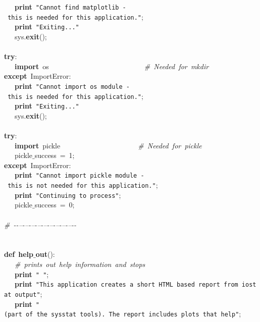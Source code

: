 \mbox{}\ \ \ \textbf{print}\ \texttt{"{}Cannot\ find\ matplotlib\ -\ this\ is\ needed\ for\ this\ application."{}}; \\
\mbox{}\ \ \ \textbf{print}\ \texttt{"{}Exiting..."{}} \\
\mbox{}\ \ \ sys.\textbf{exit}(); \\
\mbox{} \\
\mbox{}\textbf{try}: \\
\mbox{}\ \ \ \textbf{import}\ os\ \ \ \ \ \ \ \ \ \ \ \ \ \ \ \ \ \ \ \ \ \ \ \ \ \ \ \textit{\#\ Needed\ for\ mkdir} \\
\mbox{}\textbf{except}\ ImportError: \\
\mbox{}\ \ \ \textbf{print}\ \texttt{"{}Cannot\ import\ os\ module\ -\ this\ is\ needed\ for\ this\ application."{}}; \\
\mbox{}\ \ \ \textbf{print}\ \texttt{"{}Exiting..."{}} \\
\mbox{}\ \ \ sys.\textbf{exit}(); \\
\mbox{} \\
\mbox{}\textbf{try}: \\
\mbox{}\ \ \ \textbf{import}\ pickle\ \ \ \ \ \ \ \ \ \ \ \ \ \ \ \ \ \ \ \ \ \ \textit{\#\ Needed\ for\ pickle} \\
\mbox{}\ \ \ pickle$\_$success\ =\ 1; \\
\mbox{}\textbf{except}\ ImportError: \\
\mbox{}\ \ \ \textbf{print}\ \texttt{"{}Cannot\ import\ pickle\ module\ -\ this\ is\ not\ needed\ for\ this\ application."{}}; \\
\mbox{}\ \ \ \textbf{print}\ \texttt{"{}Continuing\ to\ process"{}}; \\
\mbox{}\ \ \ pickle$\_$success\ =\ 0; \\
\mbox{} \\
\mbox{}\textit{\#\ -\/-\/--\/-\/--\/-\/--\/-\/--\/-\/--\/-\/--\/-\/--\/-\/--\/-\/--\/-\/-} \\
\mbox{} \\
\mbox{} \\
\mbox{}\textbf{def}\ \textbf{help$\_$out}(): \\
\mbox{}\ \ \ \textit{\#\ prints\ out\ help\ information\ and\ stops} \\
\mbox{}\ \ \ \textbf{print}\ \texttt{"{}\ "{}}; \\
\mbox{}\ \ \ \textbf{print}\ \texttt{"{}This\ application\ creates\ a\ short\ HTML\ based\ report\ from\ iostat\ output"{}}; \\
\mbox{}\ \ \ \textbf{print}\ \texttt{"{}(part\ of\ the\ sysstat\ tools).\ The\ report\ includes\ plots\ that\ help"{}}; \\
